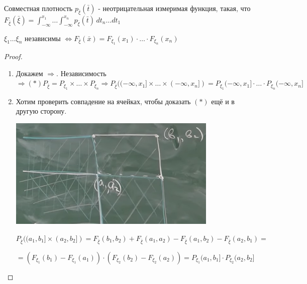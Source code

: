 \begin{definition}
    Совместная плотность $p_{\bar{\xi}} (\bar{t})$ - неотрицательная измеримая функция, такая, что $F_{\bar{\xi}} (\bar{\xi}) = \int_{-\infty}^{x_1} \ldots \int_{-\infty}^{x_n} p_{\bar{\xi}} (\bar{t}) \, dt_n \ldots dt_1$
\end{definition}

\begin{theorem}
    $\xi_1 \ldots \xi_n$ независимы $\Longleftrightarrow F_{\bar{\xi}} (\bar{x}) = F_{\xi_1} (x_1) \cdot \ldots \cdot F_{\xi_n} (x_n)$
\end{theorem}

\begin{proof}
    \begin{enumerate}
        \item {
            Докажем $\Rightarrow$. Независимость $\Rightarrow (*) P_{\bar{\xi}} = P_{\xi_1} \times \ldots \times P_{\xi_n} \Rightarrow 
            P_{\bar{\xi}} ((-\infty, x_1] \times \ldots \times (-\infty, x_n]) = P_{\xi_1} (-\infty, x_1] \cdot \ldots \cdot P_{\xi_n} (-\infty, x_n]$
        }
        \item {
            Хотим проверить совпадение на ячейках, чтобы доказать $(*)$ ещё и в другую сторону.

            \begin{center}
                \includegraphics[width=10cm]{assets/02-general-prob-theory/arbitrary-value-independence.png}
            \end{center}

            $P_{\bar{\xi}}((a_1, b_1] \times (a_2, b_2]) = F_{\bar{\xi}} (b_1, b_2)  + F_{\bar{\xi}} (a_1, a_2) - F_{\bar{\xi}} (a_1, b_2) - F_{\bar{\xi}} (a_2, b_1) =$ 

            $= (F_{\xi_1} (b_1) - F_{\xi_1}(a_1)) \cdot (F_{\xi_2}(b_2) - F_{\xi_2}(a_2)) = P_{\xi_1} (a_1, b_1] \cdot P_{\xi_2}(a_2, b_2]$
        }
    \end{enumerate}
\end{proof}

